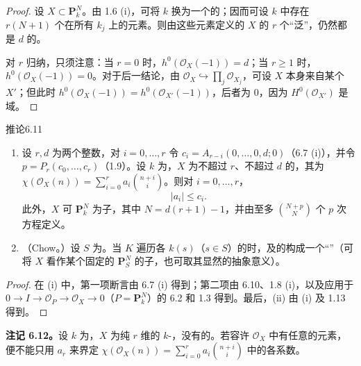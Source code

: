 \begin{proof}
设 $X\subset\mathbf P^N_k$。由 1.6 (i)，可将 $k$ 换为一个的；因而可设 $k$ 中存在 $r(N+1)$ 个在所有 $k_j$ 上的元素。则由这些元素定义的 $X$ 的 $r$ 个“泛”，仍然都是 $d$ 的。

对 $r$ 归纳，只须注意：当 $r=0$ 时，$h^0(\mathscr O_X(-1))=d$；当 $r\geq1$ 时，$h^0(\mathscr O_X(-1))=0$。对于后一结论，由 $\mathscr O_X\hookrightarrow\prod_j\mathscr O_{X_j}$，可设 $X$ 本身来自某个 $X'$；但此时 $h^0(\mathscr O_X(-1))=h^0(\mathscr O_{X'}(-1))$，后者为 $0$，因为 $H^0(\mathscr O_{X'})$ 是域。
\end{proof}
\begin{SGAresult}{推论}{6.11}
\begin{enumerate}
\item[(i)] 设 $r,d$ 为两个整数，对 $i=0,\ldots,r$ 令 $c_i=A_{r-i}(0,\ldots,0,d;0)$（6.7 (i)），并令 $p=P_r(c_0,\ldots,c_r)$（1.9）。设 $k$ 为，$X$ 为不超过 $r$、不超过 $d$ 的，其为 $\chi(\mathscr O_X(n))=\sum_{i=0}^r a_i\binom{n+i}{i}$。则对 $i=0,\ldots,r$，
\[|a_i|\leq c_i.\]
此外，$X$ 可 $\mathbf P^N_k$ 为子，其中 $N=d(r+1)-1$，并由至多 $\binom{N+p}{N}$ 个 $p$ 次方程定义。
\item[(ii)] （Chow。）设 $S$ 为。当 $K$ 遍历各 $k(s)$（$s\in S$）的时，及的构成一个“”（可将 $X$ 看作某个固定的 $\mathbf P^N_S$ 的子，也可取其显然的抽象意义）。
\end{enumerate}
\end{SGAresult}
\begin{proof}
在 (i) 中，第一项断言由 6.7 (i) 得到；第二项由 6.10、1.8 (i)，以及应用于 $0\to I\to\mathscr O_P\to\mathscr O_X\to0$（$P=\mathbf P^N_k$）的 6.2 和 1.3 得到。最后，(ii) 由 (i) 及 1.13 得到。
\end{proof}
\textbf{注记 6.12。}设 $k$ 为，$X$ 为纯 $r$ 维的 $k$-，没有的。若容许 $\mathscr O_X$ 中有任意的元素，便不能只用 $a_r$ 来界定 $\chi(\mathscr O_X(n))=\sum_{i=0}^r a_i\binom{n+i}{i}$ 中的各系数。


